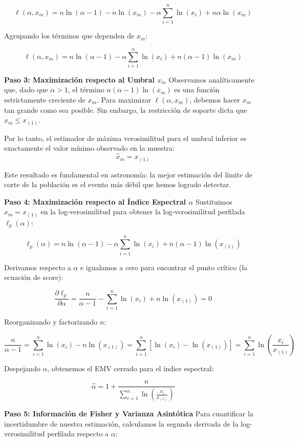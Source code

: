 $$ \ell(\alpha, x_m) = n \ln(\alpha - 1) - n \ln(x_m) - \alpha \sum_{i=1}^{n} \ln(x_i) + n \alpha \ln(x_m) $$

Agrupando los términos que dependen de $x_m$:

$$ \ell(\alpha, x_m) = n \ln(\alpha - 1) - \alpha \sum_{i=1}^{n} \ln(x_i) + n(\alpha - 1) \ln(x_m) $$

\textbf{Paso 3: Maximización respecto al Umbral $x_m$}
Observamos analíticamente que, dado que $\alpha > 1$, el término $n(\alpha - 1) \ln(x_m)$ es una función estrictamente creciente de $x_m$. Para maximizar $\ell(\alpha, x_m)$, debemos hacer $x_m$ tan grande como sea posible. Sin embargo, la restricción de soporte dicta que $x_m \le x_{(1)}$. 

Por lo tanto, el estimador de máxima verosimilitud para el umbral inferior es exactamente el valor mínimo observado en la muestra:
$$ \hat{x}_m = x_{(1)} $$

Este resultado es fundamental en astronomía: la mejor estimación del límite de corte de la población es el evento más débil que hemos logrado detectar.

\textbf{Paso 4: Maximización respecto al Índice Espectral $\alpha$}
Sustituimos $\hat{x}_m = x_{(1)}$ en la log-verosimilitud para obtener la log-verosimilitud perfilada $\ell_p(\alpha)$:

$$ \ell_p(\alpha) = n \ln(\alpha - 1) - \alpha \sum_{i=1}^{n} \ln(x_i) + n(\alpha - 1) \ln(x_{(1)}) $$

Derivamos respecto a $\alpha$ e igualamos a cero para encontrar el punto crítico (la ecuación de score):

$$ \frac{\partial \ell_p}{\partial \alpha} = \frac{n}{\alpha - 1} - \sum_{i=1}^{n} \ln(x_i) + n \ln(x_{(1)}) = 0 $$

Reorganizando y factorizando $n$:

$$ \frac{n}{\alpha - 1} = \sum_{i=1}^{n} \ln(x_i) - n \ln(x_{(1)}) = \sum_{i=1}^{n} \left[ \ln(x_i) - \ln(x_{(1)}) \right] = \sum_{i=1}^{n} \ln\left( \frac{x_i}{x_{(1)}} \right) $$

Despejando $\alpha$, obtenemos el EMV cerrado para el índice espectral:

$$ \hat{\alpha} = 1 + \frac{n}{\sum_{i=1}^{n} \ln\left( \frac{x_i}{x_{(1)}} \right)} $$

\textbf{Paso 5: Información de Fisher y Varianza Asintótica}
Para cuantificar la incertidumbre de nuestra estimación, calculamos la segunda derivada de la log-verosimilitud perfilada respecto a $\alpha$:

